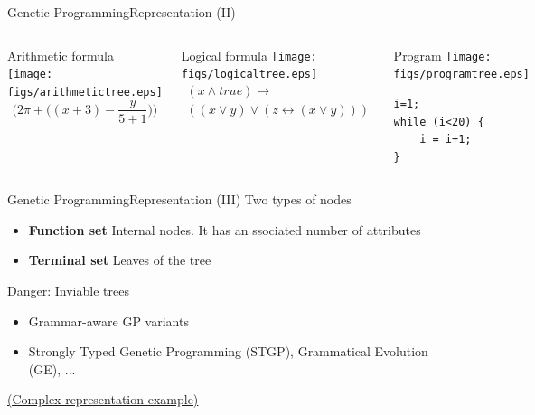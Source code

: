 \documentclass[10pt,compress]{beamer} %
\begin{document}
\begin{frame}[fragile]{Genetic Programming}{Representation (II)}
    \begin{columns}
	   		\begin{center}
	    	Arithmetic formula
			\texttt{[image: figs/arithmetictree.eps]}\\
			\begin{equation*}
			\bigg( 2\pi + \big((x+3)-\frac{y}{5+1}\big)\bigg)
			\end{equation*}	
			\end{center}
	   		\begin{center}
	    	Logical formula
			\texttt{[image: figs/logicaltree.eps]}\\
			\begin{multline*}
			(x	\wedge true) \to \\((x \vee y) \vee (z \leftrightarrow (x\vee y)))
			\end{multline*}	
			\end{center}
	   		\begin{center}
	    	Program
			\texttt{[image: figs/programtree.eps]}\\
			\begin{verbatim}
i=1;
while (i<20) {
    i = i+1;
}
\end{verbatim}	
			\end{center}
	\end{columns}
\end{frame}

\begin{frame}[fragile]{Genetic Programming}{Representation (III)}
	Two types of nodes
	\begin{itemize}
		\item \textbf{Function set} Internal nodes. It has an ssociated number of attributes
		\item \textbf{Terminal set} Leaves of the tree
	\end{itemize}
	Danger: Inviable trees
	\begin{itemize}
		\item Grammar-aware GP variants
		\item Strongly Typed Genetic Programming (STGP), Grammatical Evolution (GE), ...
	\end{itemize}
	\href{http://www.genetic-programming.com/gpcircuitanimation.gif}{(Complex representation example)}
\end{frame}
\end{document}
